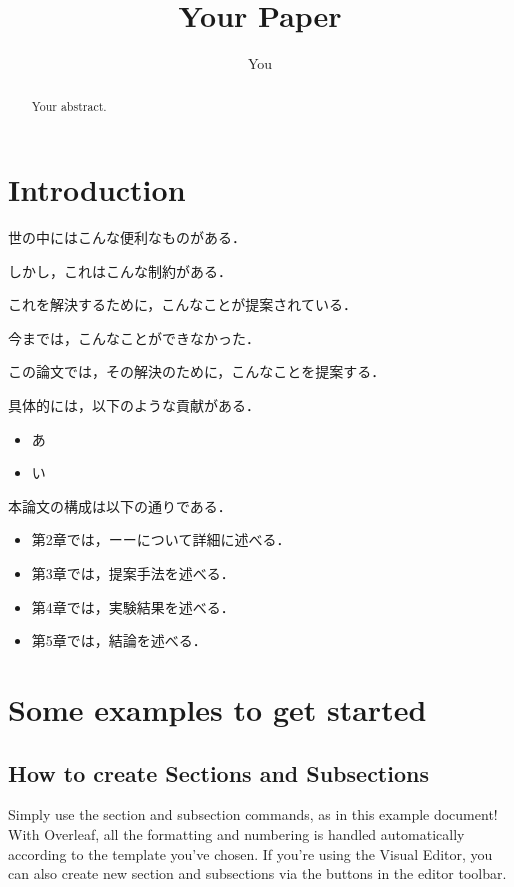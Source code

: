 \documentclass[dvipdfmx,twocolumn]{jsarticle}
\title{Your Paper}
\author{You}
\begin{document}
\maketitle

\begin{abstract}
      Your abstract.
\end{abstract}

\section{Introduction}

      世の中にはこんな便利なものがある．

      しかし，これはこんな制約がある．

      これを解決するために，こんなことが提案されている．

      今までは，こんなことができなかった．

      この論文では，その解決のために，こんなことを提案する．

      具体的には，以下のような貢献がある．
      \begin{itemize}
            \item あ
            \item い
      \end{itemize}

      本論文の構成は以下の通りである．
      \begin{itemize}
            \item 第2章では，ーーについて詳細に述べる．
            \item 第3章では，提案手法を述べる．
            \item 第4章では，実験結果を述べる．
            \item 第5章では，結論を述べる．
      \end{itemize}

\section{Some examples to get started}

      \subsection{How to create Sections and Subsections}

            Simply use the section and subsection commands, as in this example document! With Overleaf, all the formatting and numbering is handled automatically according to the template you've chosen. If you're using the Visual Editor, you can also create new section and subsections via the buttons in the editor toolbar.
\end{document}
